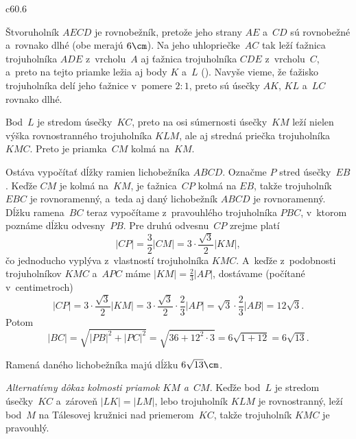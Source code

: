 {%
\epsplace c60.6 \hfil\Obr\par
Štvoruholník $AECD$ je rovnobežník, pretože jeho strany $AE$ a~$CD$
sú rovnobežné a~rovnako dlhé (obe merajú $6\cm$).
Na jeho uhlopriečke~$AC$ tak leží ťažnica trojuholníka $ADE$ z~vrcholu~$A$
aj ťažnica trojuholníka $CDE$ z~vrcholu~$C$,
a~preto na tejto priamke ležia aj body $K$ a~$L$ (\obr).
Navyše vieme, že ťažisko trojuholníka delí jeho ťažnice v~pomere $2:1$, preto sú úsečky $AK$,
$KL$ a~$LC$ rovnako dlhé.
\inspicture

Bod~$L$ je stredom úsečky~$KC$, preto na osi súmernosti úsečky~$KM$
leží nielen výška rovnostranného trojuholníka $KLM$, ale
aj stredná priečka trojuholníka~$KMC$. Preto je priamka~$CM$ kolmá na~$KM$.


Ostáva vypočítať dĺžky ramien lichobežníka $ABCD$. Označme $P$ stred úsečky~$EB$.
Keďže $CM$ je kolmá na~$KM$, je ťažnica~$CP$ kolmá na $EB$, takže trojuholník $EBC$
je rovnoramenný, a~teda aj daný lichobežník $ABCD$ je rovnoramenný.
Dĺžku ramena~$BC$ teraz vypočítame z~pravouhlého trojuholníka $PBC$, v~ktorom poznáme
dĺžku odvesny~$PB$. Pre druhú odvesnu~$CP$ zrejme platí
$$
|CP| = \frac32|CM|=3 \cdot\frac{\sqrt{3}}2|KM|,
$$
čo jednoducho vyplýva z~vlastností trojuholníka $KMC$.
A~keďže z~podobnosti trojuholníkov $KMC$ a~$APC$ máme $|KM|=\frac23|AP|$, dostávame (počítané
v~centimetroch)
$$
|CP| = 3 \cdot\frac{\sqrt{3}}2|KM|=3 \cdot\frac{\sqrt{3}}2\cdot\frac23|AP|=
 \sqrt{3} \cdot\frac23|AB|= 12\sqrt 3.
$$
Potom
$$
|BC| = \sqrt{|PB|^2+|PC|^2}=\sqrt{36+12^2\cdot 3}=6\sqrt{1+12} = 6\sqrt{13}.
$$

Ramená daného lichobežníka majú dĺžku $6\sqrt{13}\cm$.

\medskip\noindent
{\it Alternatívny dôkaz kolmosti priamok $KM$ a~$CM$}.
Keďže bod~$L$ je stredom úsečky~$KC$ a~zároveň $|LK| = |LM|$,
lebo trojuholník $KLM$ je rovnostranný,
leží bod~$M$ na Tálesovej kružnici nad priemerom~$KC$, takže trojuholník
$KMC$ je pravouhlý.

%


}
